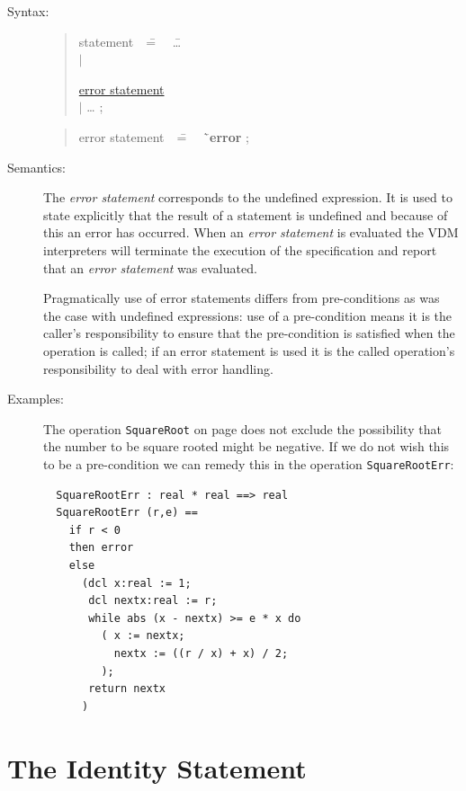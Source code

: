\documentclass{overturerepchap}
\newcommand{\Rule}[2]{
  \begin{quote}\begin{tabbing}
    #1\index{#1}\ \ \= = \ \ \= #2  ; %
    
  \end{tabbing}\end{quote}
  }
\newcommand{\Ruleref}[1]{
  \hyperlink{rule:#1}{#1}}
\newcommand{\dsep}{\\ \> $|$ \>}
\newcommand{\Lop}[1]{`{\bf\ttfamily #1}\Quote}
\begin{document}
\begin{description}
\item[Syntax:]
  \Rule{statement}{
    \ldots \dsep
    \Ruleref{error statement} \dsep
    \ldots
    }

  \Rule{error statement}{
    \Lop{error}
    }

\item[Semantics:] The {\it error statement} corresponds to the
undefined expression. It is used to state explicitly that the result
of a statement is undefined and because of this an error has occurred.
When an {\it error statement} is evaluated the
VDM interpreters will
terminate the execution of the specification and report that an {\it
error statement} was evaluated.

  Pragmatically use of error statements differs from
  pre-conditions as was the case with undefined expressions: use of a
  pre-condition means it is the caller's 
  responsibility to ensure that the pre-condition is satisfied when
  the operation is called; if an error statement is used it is the
  called operation's responsibility to deal with error handling.


\item[Examples:] The operation \texttt{SquareRoot} on page
  \pageref{squarerootDef} does not exclude
  the possibility that the number to be square rooted might be
  negative. If we do not wish this to be a pre-condition we can 
remedy this in the operation \texttt{SquareRootErr}:
  \begin{lstlisting}
  SquareRootErr : real * real ==> real
  SquareRootErr (r,e) ==
    if r < 0
    then error
    else
      (dcl x:real := 1;
       dcl nextx:real := r;
       while abs (x - nextx) >= e * x do
         ( x := nextx;
           nextx := ((r / x) + x) / 2;
         );
       return nextx
      )
  \end{lstlisting}
\end{description}

\section{The Identity Statement}
\end{document}
